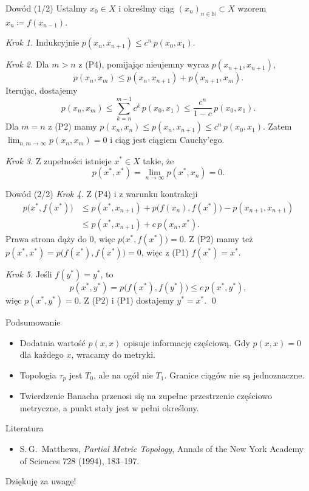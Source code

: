 \documentclass{beamer}
\newcommand{\N}{\mathbb{N}}
\begin{document}
\begin{frame}{Dowód (1/2)}
  Ustalmy $x_0\in X$ i określmy ciąg $(x_n)_{n\in\N}\subset X$ wzorem
  $x_n\coloneqq f(x_{n-1})$.

  \medskip
  \emph{Krok 1.} Indukcyjnie $p(x_n,x_{n+1})\le c^n\,p(x_0,x_1)$.

  \medskip
  \emph{Krok 2.} Dla $m>n$ z (P4), pomijając nieujemny wyraz $p(x_{n+1},x_{n+1})$,
  \[
    p(x_n,x_m)\le p(x_n,x_{n+1})+p(x_{n+1},x_m).
  \]
  Iterując, dostajemy
  \[
    p(x_n,x_m)\le\sum_{k=n}^{m-1}c^k\,p(x_0,x_1)\le\frac{c^n}{1-c}\,p(x_0,x_1).
  \]
  Dla $m=n$ z (P2) mamy $p(x_n,x_n)\le p(x_n,x_{n+1})\le c^n\,p(x_0,x_1)$.
  Zatem $\lim_{n,m\to\infty}p(x_n,x_m)=0$ i ciąg jest ciągiem Cauchy'ego.

  \medskip
  \emph{Krok 3.} Z zupełności istnieje $x^*\in X$ takie, że
  \[
    p(x^*,x^*)=\lim_{n\to\infty}p(x^*,x_n)=0.
  \]
\end{frame}

\begin{frame}{Dowód (2/2)}
  \emph{Krok 4.} Z (P4) i z warunku kontrakcji
  \begin{align*}
    p\bigl(x^*,f(x^*)\bigr)&\le p(x^*,x_{n+1})+p\bigl(f(x_n),f(x^*)\bigr)-p(x_{n+1},x_{n+1})\\
    &\le p(x^*,x_{n+1})+c\,p(x_n,x^*).
  \end{align*}
  Prawa strona dąży do $0$, więc $p\bigl(x^*,f(x^*)\bigr)=0$.
  Z (P2) mamy też $p(x^*,x^*)=p\bigl(f(x^*),f(x^*)\bigr)=0$, więc z (P1)
  $f(x^*)=x^*$.

  \medskip
  \emph{Krok 5.} Jeśli $f(y^*)=y^*$, to
  \[
    p(x^*,y^*)=p\bigl(f(x^*),f(y^*)\bigr)\le c\,p(x^*,y^*),
  \]
  więc $p(x^*,y^*)=0$. Z (P2) i (P1) dostajemy $y^*=x^*$. \qed
\end{frame}

\begin{frame}{Podsumowanie}
  \begin{itemize}
    \item Dodatnia wartość $p(x,x)$ opisuje informację częściową.
          Gdy $p(x,x)=0$ dla każdego $x$, wracamy do metryki.
    \item Topologia $\tau_p$ jest $T_0$, ale na ogół nie $T_1$.
          Granice ciągów nie są jednoznaczne.
    \item Twierdzenie Banacha przenosi się na zupełne przestrzenie częściowo
          metryczne, a punkt stały jest w pełni określony.
  \end{itemize}
\end{frame}

\begin{frame}{Literatura}
  \begin{itemize}
    \item S.\,G.~Matthews, \emph{Partial Metric Topology},
          Annals of the New York Academy of Sciences 728 (1994), 183--197.
  \end{itemize}

  \vfill
  \begin{center}
    \Large Dziękuję za uwagę!
  \end{center}
  \vfill
\end{frame}
\end{document}
